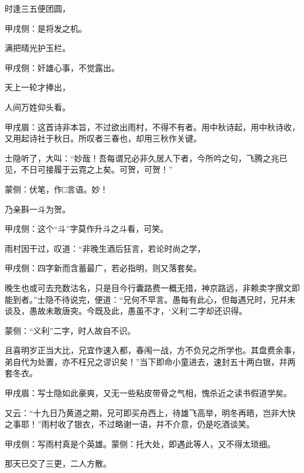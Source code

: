 \begin{poem}
    \begin{pl}时逢三五便团圆，\end{pl}\begin{note}甲戌侧：是将发之机。\end{note}

    \begin{pl}满把晴光护玉栏。\end{pl}\begin{note}甲戌侧：奸雄心事，不觉露出。\end{note}

    \begin{pl}天上一轮才捧出，\end{pl}

    \begin{pl}人间万姓仰头看。\end{pl}\begin{note}甲戌眉：这首诗非本旨，不过欲出雨村，不得不有者。用中秋诗起，用中秋诗收，又用起诗社于秋日。所叹者三春也，却用三秋作关键。\end{note}
\end{poem}


\begin{parag}
    士隐听了，大叫：“妙哉！吾每谓兄必非久居人下者，今所吟之句，飞腾之兆已见，不日可接履于云霓之上矣。可贺，可贺！”\begin{note}蒙侧：伏笔，作□言语。妙！\end{note}乃亲斟一斗为贺。\begin{note}甲戌侧：这个“斗”字莫作升斗之斗看，可笑。\end{note}雨村因干过，叹道：“非晚生酒后狂言，若论时尚之学，\begin{note}甲戌侧：四字新而含蓄最广，若必指明，则又落套矣。\end{note}晚生也或可去充数沽名，只是目今行囊路费一概无措，神京路远，非赖卖字撰文即能到者。”士隐不待说完，便道：“兄何不早言。愚每有此心，但每遇兄时，兄幷未谈及，愚故未敢唐突。今既及此，愚虽不才，‘义利’二字却还识得。\begin{note}蒙侧：“义利”二字，时人故自不识。\end{note}且喜明岁正当大比，兄宜作速入都，春闱一战，方不负兄之所学也。其盘费余事，弟自代为处置，亦不枉兄之谬识矣！”当下即命小童进去，速封五十两白银，幷两套冬衣。\begin{note}甲戌眉：写士隐如此豪爽，又无一些粘皮带骨之气相，愧杀近之读书假道学矣。\end{note}又云：“十九日乃黄道之期，兄可即买舟西上，待雄飞高举，明冬再晤，岂非大快之事耶！”雨村收了银衣，不过略谢一语，幷不介意，仍是吃酒谈笑。\begin{note}甲戌侧：写雨村真是个英雄。蒙侧：托大处，即遇此等人，又不得太琐细。\end{note}那天已交了三更，二人方散。
\end{parag}


